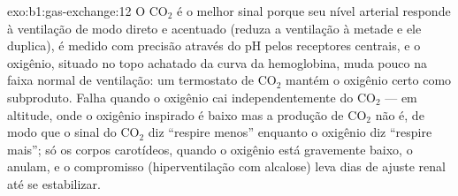 \begin{solution}{exo:b1:gas-exchange:12}
O $\mathrm{CO_2}$ é o melhor sinal porque seu nível arterial responde à
ventilação de modo direto e acentuado (reduza a ventilação à metade e
ele duplica), é medido com precisão através do pH pelos receptores
centrais, e o oxigênio, situado no topo achatado da curva da
hemoglobina, muda pouco na faixa normal de ventilação: um termostato
de $\mathrm{CO_2}$ mantém o oxigênio certo como subproduto. Falha
quando o oxigênio cai independentemente do $\mathrm{CO_2}$ --- em
altitude, onde o oxigênio inspirado é baixo mas a produção de
$\mathrm{CO_2}$ não é, de modo que o sinal do $\mathrm{CO_2}$ diz
``respire menos'' enquanto o oxigênio diz ``respire mais''; só os
corpos carotídeos, quando o oxigênio está gravemente baixo, o anulam,
e o compromisso (hiperventilação com alcalose) leva dias de ajuste
renal até se estabilizar.
\end{solution}

